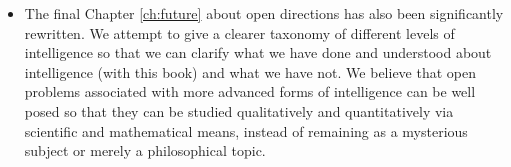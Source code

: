 \documentclass[../../book-main.tex]{subfiles}
\begin{document}
\begin{itemize}
        many more detailed implementations of distribution learning and representation learning for real-world data, including natural 2D images,  natural 3D objects, human body motions, and natural languages, under almost all popular and practical settings, supervised, weakly supervised, unsupervised, and conditioned. 
    \item The final Chapter \ref{ch:future} about open directions has also been
        significantly rewritten. We attempt to give a clearer taxonomy of
        different levels of intelligence so that we can clarify what we have
        done and understood about intelligence (with this book) and what we have not. We believe that open problems associated with more advanced forms of intelligence can be well posed so that they can be studied qualitatively and quantitatively via scientific and mathematical means, instead of remaining as a mysterious subject or merely a philosophical topic.
\end{itemize}
\end{document}
